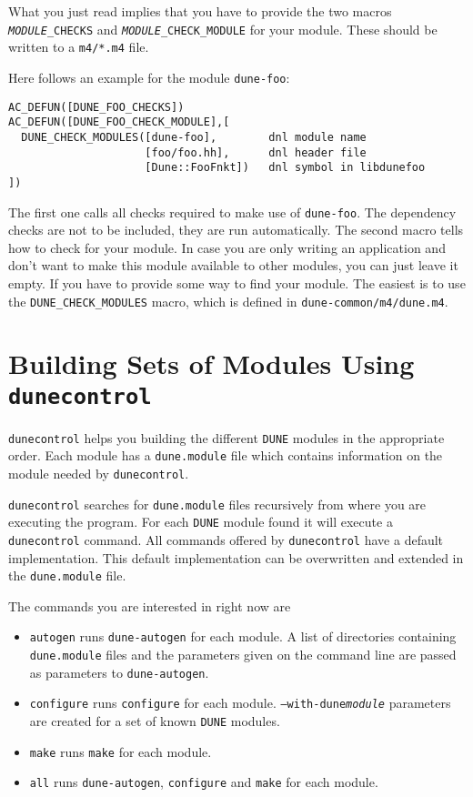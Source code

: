 \documentclass[11pt,a4paper,headinclude,footinclude,DIV16,normalheadings]{scrartcl}
\newcommand{\dune}{\texttt{DUNE}\xspace}
\newcommand{\autogen}{\texttt{dune-autogen}\xspace}
\newcommand{\configure}{\texttt{configure}\xspace}
\newcommand{\dunecontrol}{\texttt{dunecontrol}\xspace}
\newcommand{\dunemodule}{\texttt{dune.module}\xspace}
\newcommand{\make}{\texttt{make}\xspace}
\begin{document}
What you just read implies that you have to provide the two macros
\texttt{\emph{MODULE}\_CHECKS} and
\texttt{\emph{MODULE}\_CHECK\_MODULE} for your module. These should be
written to a \texttt{m4/*.m4} file.

Here follows an example for the module \texttt{dune-foo}:

\begin{lstlisting}
AC_DEFUN([DUNE_FOO_CHECKS])
AC_DEFUN([DUNE_FOO_CHECK_MODULE],[
  DUNE_CHECK_MODULES([dune-foo],        dnl module name
                     [foo/foo.hh],      dnl header file
                     [Dune::FooFnkt])   dnl symbol in libdunefoo
])
\end{lstlisting}

The first one calls all checks required to make use of
\texttt{dune-foo}. The dependency checks are not to be included, they
are run automatically. The second macro tells how to check for your
module. In case you are only writing an application and don't want to
make this module available to other modules, you can just leave it
empty. If you have to provide some way to find your module. The
easiest is to use the \texttt{DUNE\_CHECK\_MODULES} macro, which is
defined in \texttt{dune-common/m4/dune.m4}.

\section{Building Sets of Modules Using \dunecontrol}
\label{dunecontrol}
\dunecontrol helps you building the different \dune modules in the
appropriate order. Each module has a \dunemodule file which contains
information on the module needed by \dunecontrol. 

\dunecontrol searches for \dunemodule files recursively from where you
are executing the program. For each \dune module found it will execute
a \dunecontrol command. All commands offered by \dunecontrol have a
default implementation. This default implementation can be overwritten
and extended in the \dunemodule file.

The commands you are interested in right now are
\begin{itemize}
\item \texttt{autogen} runs \autogen for each module. A list of
  directories containing \dunemodule files and the parameters given on
  the command line are passed as parameters to \autogen.
\item \texttt{configure} runs \configure for each
  module. \texttt{--with-dune\textit{module}} parameters are created
  for a set of known \dune modules.
\item \texttt{make} runs \make for each module.
\item \texttt{all} runs \autogen, \configure and \make for each module.
\end{itemize}
\end{document}
